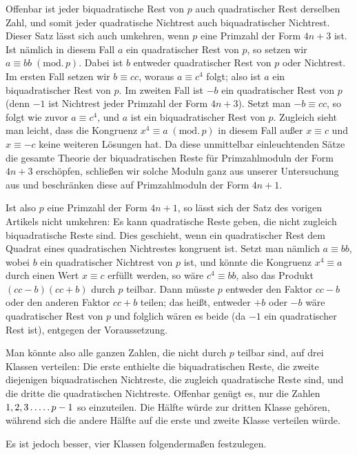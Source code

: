 Offenbar ist jeder biquadratische Rest von $p$ auch quadratischer Rest derselben Zahl, und somit jeder quadratische Nichtrest auch biquadratischer Nichtrest. Dieser Satz lässt sich auch umkehren, wenn $p$ eine Primzahl der Form $4n+3$ ist. Ist nämlich in diesem Fall $a$ ein quadratischer Rest von $p$, so setzen wir $a\equiv bb\; (\mathrm{mod.}\,p)$. Dabei ist $b$ entweder quadratischer Rest von $p$ oder Nichtrest. Im ersten Fall setzen wir $b\equiv cc$, woraus $a\equiv c^4$ folgt; also ist $a$ ein biquadratischer Rest von $p$. Im zweiten Fall ist $-b$ ein quadratischer Rest von $p$ (denn $-1$ ist Nichtrest jeder Primzahl der Form $4n+3$). Setzt man $-b\equiv cc$, so folgt wie zuvor $a\equiv c^4$, und $a$ ist ein biquadratischer Rest von $p$. Zugleich sieht man leicht, dass die Kongruenz $x^4\equiv a\; (\mathrm{mod.}\,p)$ in diesem Fall außer $x\equiv c$ und $x\equiv-c$ keine weiteren Lösungen hat. Da diese unmittelbar einleuchtenden Sätze die gesamte Theorie der biquadratischen Reste für Primzahlmoduln der Form $4n+3$ erschöpfen, schließen wir solche Moduln ganz aus unserer Untersuchung aus und beschränken diese auf Primzahlmoduln der Form $4n+1$.

Ist also $p$ eine Primzahl der Form $4n+1$, so lässt sich der Satz des vorigen Artikels nicht umkehren: Es kann quadratische Reste geben, die nicht zugleich biquadratische Reste sind. Dies geschieht, wenn ein quadratischer Rest dem Quadrat eines quadratischen Nichtrestes kongruent ist. Setzt man nämlich $a\equiv bb$, wobei $b$ ein quadratischer %
Nichtrest von $p$ ist, und könnte die Kongruenz $x^4\equiv a$ durch einen Wert $x\equiv c$ erfüllt werden, so wäre $c^4\equiv bb$, also das Produkt $(cc-b)(cc+b)$ durch $p$ teilbar. Dann müsste $p$ entweder den Faktor $cc-b$ oder den anderen Faktor $cc+b$ teilen; das heißt, entweder $+b$ oder $-b$ wäre quadratischer Rest von $p$ und folglich wären es beide (da $-1$ ein quadratischer Rest ist), entgegen der Voraussetzung.

Man könnte also alle ganzen Zahlen, die nicht durch $p$ teilbar sind, auf drei Klassen verteilen: Die erste enthielte die biquadratischen Reste, die zweite diejenigen biquadratischen Nichtreste, die zugleich quadratische Reste sind, und die dritte die quadratischen Nichtreste. Offenbar genügt es, nur die Zahlen $1,2,3\mathinner{.\,.\,.\,.\,.} p-1$ so einzuteilen. Die Hälfte würde zur dritten Klasse gehören, während sich die andere Hälfte auf die erste und zweite Klasse verteilen würde.

\newpage{}
Es ist jedoch besser, vier Klassen folgendermaßen festzulegen.

